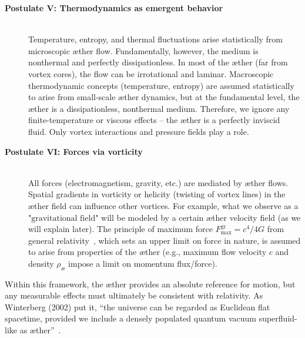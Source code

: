 \begin{description}
    \item[\textbf{Postulate V: Thermodynamics as emergent behavior}] \hfill \\
    Temperature, entropy, and thermal fluctuations arise statistically from microscopic æther flow. Fundamentally, however, the medium is nonthermal and perfectly dissipationless. In most of the æther (far from vortex cores), the flow can be irrotational and laminar. Macroscopic thermodynamic concepts (temperature, entropy) are assumed statistically to arise from small-scale æther dynamics, but at the fundamental level, the æther is a dissipationless, nonthermal medium. Therefore, we ignore any finite-temperature or viscous effects – the æther is a perfectly inviscid fluid. Only vortex interactions and pressure fields play a role.

    \item[\textbf{Postulate VI: Forces via vorticity}] \hfill \\
    All forces (electromagnetism, gravity, etc.) are mediated by æther flows.
    Spatial gradients in vorticity or helicity (twisting of vortex lines) in the æther field can influence other vortices. For example, what we observe as a $\text{"gravitational field"}$ will be modeled by a certain æther velocity field (as we will explain later). The principle of maximum force $ F^{\text{gr}}_{\text{max}} = c^4 / 4 G $ from general relativity~\cite{Schiller2022-maxforce}, which sets an upper limit on force in nature, is assumed to arise from properties of the æther (e.g., maximum flow velocity $c$ and density $\rho_\text{\ae}$ impose a limit on momentum flux/force).
\end{description}

Within this framework, the æther provides an absolute reference for motion, but any measurable effects must ultimately be consistent with relativity. As Winterberg (2002) put it, ``the universe can be regarded as Euclidean flat spacetime, provided we include a densely populated quantum vacuum superfluid-like as æther''~\cite{Winterberg2002-PlanckÆther}.

